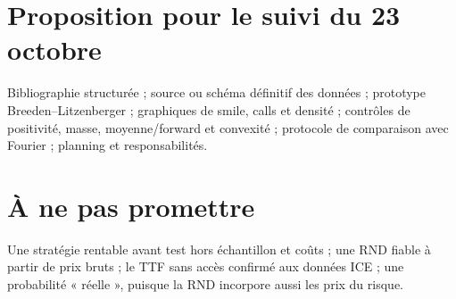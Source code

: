 \documentclass[11pt,a4paper]{article}
\begin{document}
\section*{Proposition pour le suivi du 23 octobre}
Bibliographie structurée ; source ou schéma définitif des données ; prototype
Breeden--Litzenberger ; graphiques de smile, calls et densité ; contrôles de
positivité, masse, moyenne/forward et convexité ; protocole de comparaison avec
Fourier ; planning et responsabilités.

\section*{À ne pas promettre}
Une stratégie rentable avant test hors échantillon et coûts ; une RND fiable à
partir de prix bruts ; le TTF sans accès confirmé aux données ICE ; une probabilité
« réelle », puisque la RND incorpore aussi les prix du risque.
\end{document}
